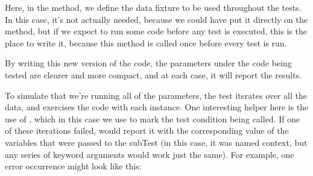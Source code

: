 \documentclass[a4paper,10pt,english]{sphinxmanual}
\begin{document}
\begin{sphinxVerbatim}[commandchars=\\\{\}]
     
            
             
                  
                 
\end{sphinxVerbatim}

Here, in the  method, we define the data fixture to be used throughout the tests. In
this case, it’s not actually needed, because we could have put it directly on the method, but
if we expect to run some code before any test is executed, this is the place to write it,
because this method is called once before every test is run.

By writing this new version of the code, the parameters under the code being tested are
clearer and more compact, and at each case, it will report the results.

To simulate that we’re running all of the parameters, the test iterates over all the data, and
exercises the code with each instance. One interesting helper here is the use of ,
which in this case we use to mark the test condition being called. If one of these iterations
failed,  would report it with the corresponding value of the variables that were
passed to the subTest (in this case, it was named context, but any series of keyword
arguments would work just the same). For example, one error occurrence might look like
this:
\end{document}
